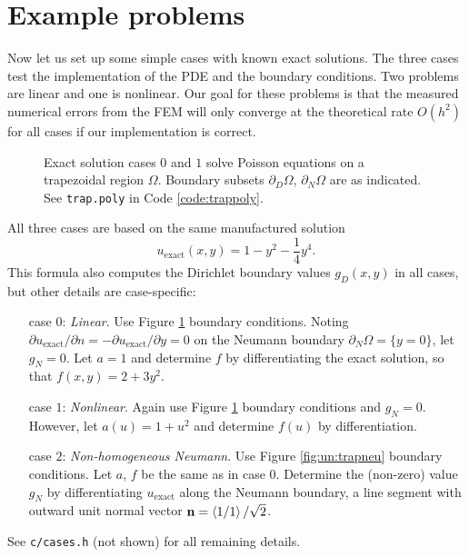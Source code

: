 \section{Example problems}

Now let us set up some simple cases with known exact solutions.  The three cases test the implementation of the PDE and the boundary conditions.  Two problems are linear and one is nonlinear.  Our goal for these problems is that the measured numerical errors from the FEM will only converge at the theoretical rate $O(h^2)$ \citep{Elmanetal2005} for all cases if our implementation is correct.

\begin{figure}

\caption{Exact solution cases $0$ and $1$ solve Poisson equations on a trapezoidal region $\Omega$.  Boundary subsets $\partial_D\Omega$, $\partial_N \Omega$ are as indicated.  See \texttt{trap.poly} in Code \ref{code:trappoly}.}
\label{fig:un:trap}
\end{figure}

All three cases are based on the same manufactured solution
\begin{equation}
  u_{\text{exact}}(x,y) = 1 - y^2 - \frac{1}{4} y^4. \label{eq:un:exactsolution}
\end{equation}
This formula also computes the Dirichlet boundary values $g_D(x,y)$ in all cases, but other details are case-specific:
\begin{itemize}
\item[case $0$:] \emph{Linear}.  Use Figure \ref{fig:un:trap} boundary conditions.  Noting $\partial u_{\text{exact}}/\partial n = -\partial u_{\text{exact}}/\partial y = 0$ on the Neumann boundary $\partial_N \Omega = \{y=0\}$, let $g_N=0$.  Let $a=1$ and determine $f$ by differentiating the exact solution, so that $f(x,y) = 2 + 3 y^2$.
\item[case $1$:] \emph{Nonlinear}.  Again use Figure \ref{fig:un:trap} boundary conditions and $g_N=0$.  However, let $a(u) = 1+u^2$ and determine $f(u)$ by differentiation.
\item[case $2$:] \emph{Non-homogeneous Neumann}.  Use Figure \ref{fig:un:trapneu} boundary conditions.  Let $a$, $f$ be the same as in case $0$.  Determine the (non-zero) value $g_N$ by differentiating $u_{\text{exact}}$ along the Neumann boundary, a line segment with outward unit normal vector $\mathbf{n} = \left<1/1\right>/\sqrt{2}$.
\end{itemize}
See \texttt{c/\CODELOC cases.h} (not shown) for all remaining details.


